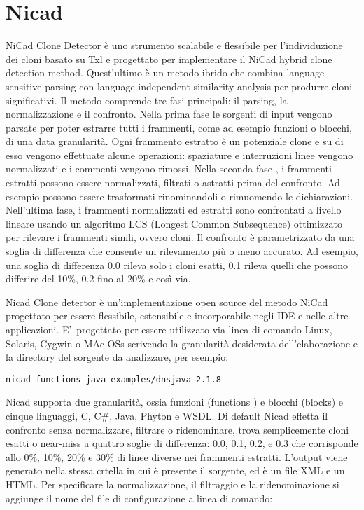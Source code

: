 \section{Nicad}
NiCad Clone Detector è uno strumento scalabile e flessibile per l'individuzione dei cloni basato su Txl e progettato per implementare il NiCad hybrid clone detection method. Quest'ultimo è un metodo ibrido che combina language-sensitive parsing con language-independent similarity analysis per produrre cloni significativi.
Il metodo comprende tre fasi principali: il parsing, la normalizzazione e il confronto.
Nella prima fase le sorgenti di input vengono parsate per poter estrarre tutti i frammenti, come ad esempio funzioni o blocchi, di una data granularità. Ogni frammento estratto è un potenziale clone e su di esso vengono effettuate alcune operazioni: spaziature e interruzioni linee vengono normalizzati e i commenti vengono rimossi. 
Nella seconda fase , i frammenti estratti possono essere normalizzati, filtrati o astratti prima del confronto. Ad esempio possono essere trasformati rinominandoli o rimuomendo le dichiarazioni.
Nell'ultima fase, i frammenti normalizzati ed estratti sono confrontati a livello lineare usando un algoritmo LCS (Longest Common Subsequence) ottimizzato per rilevare i frammenti simili, ovvero cloni. Il confronto è parametrizzato da una soglia di differenza che consente un rilevamento più o meno accurato. Ad esempio, una soglia di differenza 0.0 rileva solo i cloni esatti, 0.1 rileva quelli che possono differire del 10\%, 0.2 fino al 20\% e così via.

Nicad Clone detector è un'implementazione open source del metodo NiCad progettato per essere flessibile, estensibile e incorporabile negli IDE e nelle altre applicazioni. E'\ progettato per essere utilizzato via linea di comando Linux, Solaris, Cygwin o MAc OSs scrivendo la granularità desiderata dell'elaborazione e la directory del sorgente da analizzare, per esempio: 

\begin{center}
\verb|nicad functions java examples/dnsjava-2.1.8|
\end{center}

Nicad supporta due granularità, ossia funzioni (functions ) e blocchi (blocks) e cinque linguaggi, C, C\#, Java, Phyton e WSDL.
Di default Nicad effetta il confronto senza normalizzare, filtrare o ridenominare, trova semplicemente cloni esatti o near-miss a quattro soglie di differenza: 0.0, 0.1, 0.2, e 0.3 che corrisponde allo 0\%, 10\%, 20\% e 30\% di linee diverse nei frammenti estratti.
L'output viene generato nella stessa crtella in cui è presente il sorgente, ed è un file XML e un HTML.
Per specificare la normalizzazione, il filtraggio e la ridenominazione si aggiunge il nome del file di configurazione a linea di comando:

